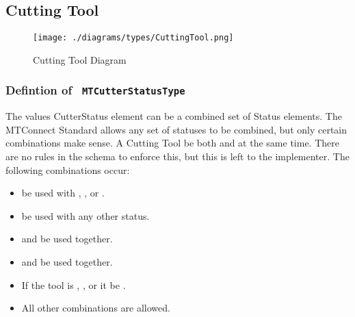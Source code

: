 \FloatBarrier
\subsection{Cutting Tool} \label{model:CuttingTool}

\begin{figure}[ht]
  \centering
    \texttt{[image: ./diagrams/types/CuttingTool.png]}
  \caption{Cutting Tool Diagram}
  \label{fig:CuttingTool}
\end{figure}

\FloatBarrier

\subsubsection{Defintion of \texttt{ MTCutterStatusType}}
  \label{type:MTCutterStatusType}

\FloatBarrier

The values CutterStatus element can be a combined set of Status elements.  The MTConnect Standard allows 
any set of statuses to be combined, but only certain combinations make sense.  A Cutting Tool \shouldnot be 
both  and  at the same time.  There are no rules in the schema to enforce this, but this 
is left to the implementer. The following combinations \mustnot occur: 

\begin{itemize}
  \item {} \mustnot be used with , , or . 
  \item {} \mustnot be used with any other status. 
  \item {} and  \mustnot be used together.
  \item {} and  \mustnot be used together.
  \item If the tool is , , or  it \mustnot be .
  \item All other combinations are allowed.
\end{itemize}

